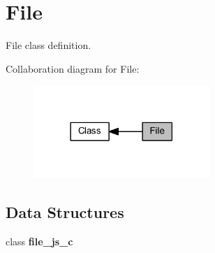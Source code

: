 \section{File}
\label{group___file}


File class definition.  


Collaboration diagram for File\+:
\nopagebreak
\begin{figure}[H]
\begin{center}
\leavevmode
\includegraphics[width=189pt]{group___file}
\end{center}
\end{figure}
\subsection*{Data Structures}
\begin{DoxyCompactItemize}
\item 
class \textbf{ file\+\_\+js\+\_\+c}
\end{DoxyCompactItemize}
